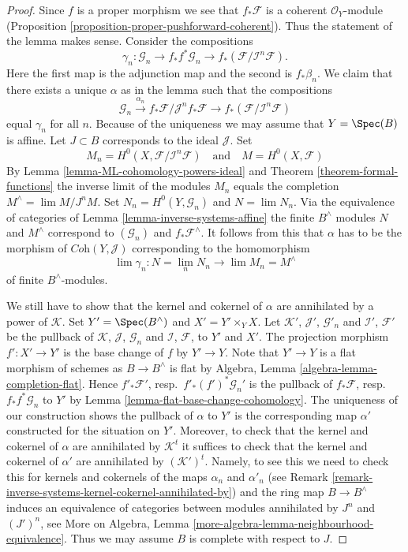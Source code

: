 \begin{proof}
Since $f$ is a proper morphism we see that $f_*\mathcal{F}$
is a coherent $\mathcal{O}_Y$-module
(Proposition \ref{proposition-proper-pushforward-coherent}).
Thus the statement of the lemma makes sense.
Consider the compositions
$$
\gamma_n : \mathcal{G}_n \to
f_*f^*\mathcal{G}_n \to
f_*(\mathcal{F}/\mathcal{I}^n\mathcal{F}).
$$
Here the first map is the adjunction map and the second is $f_*\beta_n$.
We claim that there exists a unique $\alpha$ as in the lemma
such that the compositions
$$
\mathcal{G}_n \xrightarrow{\alpha_n}
f_*\mathcal{F}/\mathcal{J}^nf_*\mathcal{F} \to
f_*(\mathcal{F}/\mathcal{I}^n\mathcal{F})
$$
equal $\gamma_n$ for all $n$. Because of the uniqueness we may assume
that $Y = \Spec(B)$ is affine. Let $J \subset B$ corresponds to the
ideal $\mathcal{J}$. Set
$$
M_n = H^0(X, \mathcal{F}/\mathcal{I}^n\mathcal{F})
\quad\text{and}\quad
M = H^0(X, \mathcal{F})
$$
By Lemma \ref{lemma-ML-cohomology-powers-ideal} and
Theorem \ref{theorem-formal-functions}
the inverse limit of the modules
$M_n$ equals the completion $M^\wedge = \lim M/J^nM$.
Set $N_n = H^0(Y, \mathcal{G}_n)$ and $N = \lim N_n$.
Via the equivalence of categories of
Lemma \ref{lemma-inverse-systems-affine}
the finite $B^\wedge$ modules $N$ and $M^\wedge$ correspond
to $(\mathcal{G}_n)$ and $f_*\mathcal{F}^\wedge$.
It follows from this that $\alpha$ has to be the morphism of
$\textit{Coh}(Y, \mathcal{J})$ corresponding to the homomorphism
$$
\lim \gamma_n : N = \lim_n N_n \longrightarrow \lim M_n = M^\wedge
$$
of finite $B^\wedge$-modules.

\medskip\noindent
We still have to show that the kernel and cokernel of $\alpha$ are
annihilated by a power of $\mathcal{K}$. Set $Y' = \Spec(B^\wedge)$
and $X' = Y' \times_Y X$. Let $\mathcal{K}'$, $\mathcal{J}'$, $\mathcal{G}'_n$
and $\mathcal{I}'$, $\mathcal{F}'$ be the pullback of
$\mathcal{K}$, $\mathcal{J}$, $\mathcal{G}_n$ and
$\mathcal{I}$, $\mathcal{F}$, to $Y'$ and $X'$.
The projection morphism $f' : X' \to Y'$ is the base change of
$f$ by $Y' \to Y$. Note that $Y' \to Y$ is a flat morphism of schemes
as $B \to B^\wedge$ is flat by
Algebra, Lemma \ref{algebra-lemma-completion-flat}.
Hence $f'_*\mathcal{F}'$, resp.\ $f'_*(f')^*\mathcal{G}_n'$
is the pullback of $f_*\mathcal{F}$, resp.\ $f_*f^*\mathcal{G}_n$
to $Y'$ by Lemma \ref{lemma-flat-base-change-cohomology}.
The uniqueness of our construction shows the pullback of $\alpha$ to $Y'$
is the corresponding map $\alpha'$ constructed for the situation on $Y'$.
Moreover, to check that the kernel and cokernel of $\alpha$ are
annihilated by $\mathcal{K}^t$ it suffices to check that the
kernel and cokernel of $\alpha'$ are annihilated by
$(\mathcal{K}')^t$. Namely, to see this we need to check this for
kernels and cokernels of the maps $\alpha_n$ and $\alpha'_n$
(see Remark \ref{remark-inverse-systems-kernel-cokernel-annihilated-by})
and the ring map $B \to B^\wedge$ induces
an equivalence of categories between modules annihilated by
$J^n$ and $(J')^n$, see
More on Algebra, Lemma \ref{more-algebra-lemma-neighbourhood-equivalence}.
Thus we may assume $B$ is complete with respect to $J$.


\end{proof}
